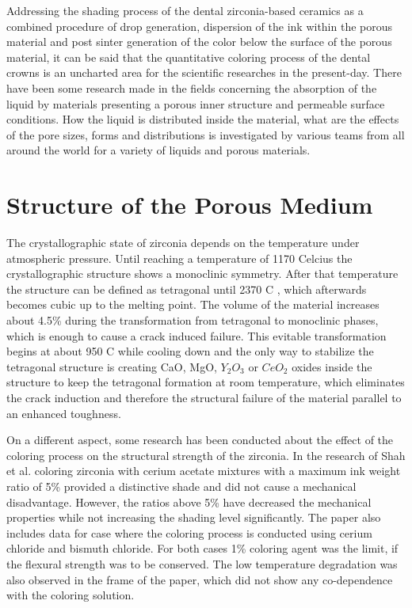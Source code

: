 Addressing the shading process of the dental zirconia-based ceramics as a combined procedure of drop generation, dispersion of the ink within the porous material and post sinter generation of the color below the surface of the porous material, it can be said that the quantitative coloring process of the dental crowns is an uncharted area for the scientific researches in the present-day. There have been some research made in the fields concerning the absorption of the liquid by materials presenting a porous inner structure and permeable surface conditions. How the liquid is distributed inside the material, what are the effects of the pore sizes, forms and distributions is investigated by various teams from all around the world for a variety of liquids and porous materials. 



\section{Structure of the Porous Medium}

The crystallographic state of zirconia depends on the temperature under atmospheric pressure. Until reaching a temperature of {1170\textdegree} Celcius the crystallographic structure shows a monoclinic symmetry. After that temperature the structure can be defined as tetragonal until {2370\textdegree} C , which afterwards becomes cubic up to the melting point. The volume of the material increases about 4.5\% during the transformation from tetragonal to monoclinic phases, which is enough to cause a crack induced failure. This evitable transformation begins at about {950\textdegree} C while cooling down and the only way to stabilize the tetragonal structure is creating CaO, MgO, $Y_{2}O_{3}$ or $CeO_{2}$ oxides inside the structure to keep the tetragonal formation  at room temperature, which eliminates the crack induction and therefore the structural failure of the material parallel to an enhanced toughness. \citep{denry2008state}

On a different aspect, some research has been conducted about the effect of the coloring process on the structural strength of the zirconia. In the research of Shah et al. coloring zirconia with cerium acetate mixtures with a maximum ink weight ratio of 5\% provided a distinctive shade and did not cause a mechanical disadvantage. However, the ratios above 5\% have decreased the mechanical properties while not increasing the shading level significantly. The paper also includes data for case where the coloring process is conducted using cerium chloride and bismuth chloride. For both cases 1\% coloring agent was the limit, if the flexural strength was to be conserved. The low temperature degradation was also observed in the frame of the paper, which did not show any co-dependence with the coloring solution.\citep{shah2008effect}

